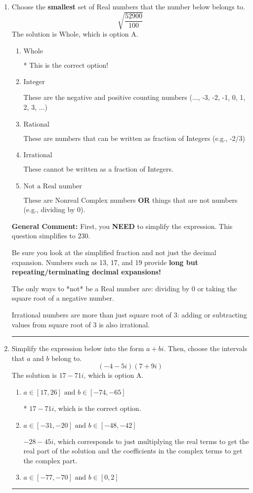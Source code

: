 \documentclass{extbook}[14pt]
\newcommand{\litem}[1]{\item #1

\rule{\textwidth}{0.4pt}}
\begin{document}
\begin{enumerate}\litem{
Choose the \textbf{smallest} set of Real numbers that the number below belongs to.
\[ \sqrt{\frac{52900}{100}} \]The solution is \( \text{Whole} \), which is option A.\begin{enumerate}[label=\Alph*.]
\item \( \text{Whole} \)

* This is the correct option!
\item \( \text{Integer} \)

These are the negative and positive counting numbers (..., -3, -2, -1, 0, 1, 2, 3, ...)
\item \( \text{Rational} \)

These are numbers that can be written as fraction of Integers (e.g., -2/3)
\item \( \text{Irrational} \)

These cannot be written as a fraction of Integers.
\item \( \text{Not a Real number} \)

These are Nonreal Complex numbers \textbf{OR} things that are not numbers (e.g., dividing by 0).
\end{enumerate}

\textbf{General Comment:} First, you \textbf{NEED} to simplify the expression. This question simplifies to $230$. 
 
 Be sure you look at the simplified fraction and not just the decimal expansion. Numbers such as 13, 17, and 19 provide \textbf{long but repeating/terminating decimal expansions!} 
 
 The only ways to *not* be a Real number are: dividing by 0 or taking the square root of a negative number. 
 
 Irrational numbers are more than just square root of 3: adding or subtracting values from square root of 3 is also irrational.
}
\litem{
Simplify the expression below into the form $a+bi$. Then, choose the intervals that $a$ and $b$ belong to.
\[ (-4 - 5 i)(7 + 9 i) \]The solution is \( 17 - 71 i \), which is option A.\begin{enumerate}[label=\Alph*.]
\item \( a \in [17, 26] \text{ and } b \in [-74, -65] \)

* $17 - 71 i$, which is the correct option.
\item \( a \in [-31, -20] \text{ and } b \in [-48, -42] \)

 $-28 - 45 i$, which corresponds to just multiplying the real terms to get the real part of the solution and the coefficients in the complex terms to get the complex part.
\item \( a \in [-77, -70] \text{ and } b \in [0, 2] \)


\end{enumerate}}
\end{enumerate}
\end{document}
